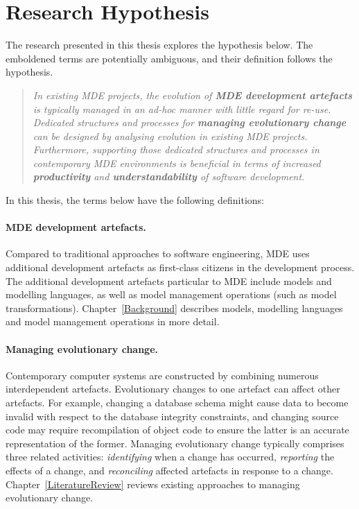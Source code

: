 
\section{Research Hypothesis}
\label{sec:hypothesis}

The research presented in this thesis explores the hypothesis below. The emboldened terms are potentially ambiguous, and their definition follows the hypothesis.

\begin{quote}
\emph{In existing MDE projects, the evolution of \textbf{MDE development artefacts} is typically managed in an ad-hoc manner with little regard for re-use. Dedicated structures and processes for \textbf{managing evolutionary change} can be designed by analysing evolution in existing MDE projects. Furthermore, supporting those dedicated structures and processes in contemporary MDE environments is beneficial in terms of increased \textbf{productivity} and \textbf{understandability} of software development.}
\end{quote}

In this thesis, the terms below have the following definitions:

\paragraph{MDE development artefacts.} Compared to traditional approaches to software engineering, MDE uses additional development artefacts as first-class citizens in the development process. The additional development artefacts particular to MDE include models and modelling languages, as well as model management operations (such as model transformations). Chapter~\ref{Background} describes models, modelling languages and model management operations in more detail.

\paragraph{Managing evolutionary change.} Contemporary computer systems are constructed by combining numerous interdependent artefacts. Evolutionary changes to one artefact can affect other artefacts. For example, changing a database schema might cause data to become invalid with respect to the database integrity constraints, and changing source code may require recompilation of object code to ensure the latter is an accurate representation of the former. Managing evolutionary change typically comprises three related activities: \emph{identifying} when a change has occurred, \emph{reporting} the effects of a change, and \emph{reconciling} affected artefacts in response to a change. Chapter~\ref{LiteratureReview} reviews existing approaches to managing evolutionary change.

